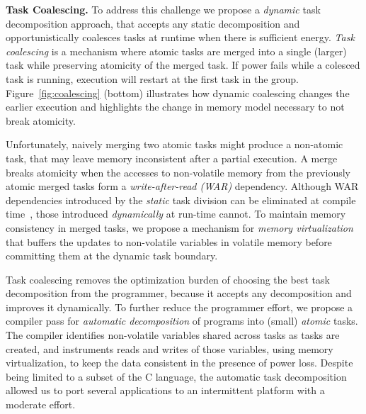 \textbf{Task Coalescing.} To address this challenge we propose a
\emph{dynamic} task decomposition approach, that accepts any static
decomposition and opportunistically coalesces tasks at runtime when
there is sufficient energy. \emph{Task coalescing} is a mechanism where
atomic tasks are merged into a single (larger) task while preserving
atomicity of the merged task. If power fails while a colesced task is
running, execution will restart at the first task in the group.
Figure~\ref{fig:coalescing} (bottom) illustrates how dynamic coalescing
changes the earlier execution and highlights the change in memory model
necessary to not break atomicity.

Unfortunately, naively merging two atomic tasks might produce a non-atomic
task, that may leave memory inconsistent after a partial execution. A merge
breaks atomicity when the accesses to non-volatile memory from the
previously atomic merged tasks form a \emph{write-after-read (WAR)}
dependency.
%
%
Although WAR dependencies introduced by the \emph{static} task division can be eliminated at compile time~\cite{alpaca}, those introduced \emph{dynamically} at
run-time cannot. To maintain memory consistency in merged tasks, we propose a
mechanism for \emph{memory virtualization} that buffers the updates to non-volatile variables in volatile memory before committing them at the dynamic task boundary.
%

Task coalescing removes the optimization burden of choosing the best task decomposition from the programmer, because it accepts any decomposition and improves it dynamically. To further reduce the programmer effort, we propose a compiler pass for \emph{automatic decomposition} of programs into (small) \emph{atomic} tasks. The compiler identifies non-volatile variables shared across tasks as tasks are created, and instruments reads and writes of those variables, using memory virtualization, to keep the data consistent in the presence of power loss. Despite being limited to a subset of the C language, the automatic task decomposition allowed us to port several
applications to an intermittent platform with a moderate effort.

